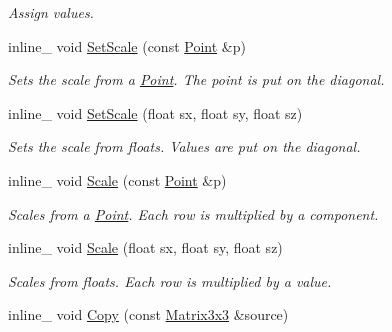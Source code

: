\begin{DoxyCompactItemize}
\begin{DoxyCompactList}\small\item\em Assign values. \end{DoxyCompactList}\item 
inline\+\_\+ void \hyperlink{classMatrix3x3_a3881bf406162edd7bff75f25eea7a38d}{Set\+Scale} (const \hyperlink{classPoint}{Point} \&p)\hypertarget{classMatrix3x3_a3881bf406162edd7bff75f25eea7a38d}{}\label{classMatrix3x3_a3881bf406162edd7bff75f25eea7a38d}

\begin{DoxyCompactList}\small\item\em Sets the scale from a \hyperlink{classPoint}{Point}. The point is put on the diagonal. \end{DoxyCompactList}\item 
inline\+\_\+ void \hyperlink{classMatrix3x3_ab41b04b95b68fef87e6acac6d1a35f55}{Set\+Scale} (float sx, float sy, float sz)\hypertarget{classMatrix3x3_ab41b04b95b68fef87e6acac6d1a35f55}{}\label{classMatrix3x3_ab41b04b95b68fef87e6acac6d1a35f55}

\begin{DoxyCompactList}\small\item\em Sets the scale from floats. Values are put on the diagonal. \end{DoxyCompactList}\item 
inline\+\_\+ void \hyperlink{classMatrix3x3_a19d9b0ee7f43f45120a9c33c625e83c3}{Scale} (const \hyperlink{classPoint}{Point} \&p)\hypertarget{classMatrix3x3_a19d9b0ee7f43f45120a9c33c625e83c3}{}\label{classMatrix3x3_a19d9b0ee7f43f45120a9c33c625e83c3}

\begin{DoxyCompactList}\small\item\em Scales from a \hyperlink{classPoint}{Point}. Each row is multiplied by a component. \end{DoxyCompactList}\item 
inline\+\_\+ void \hyperlink{classMatrix3x3_a5eab275f6204853875dd8837efdf695b}{Scale} (float sx, float sy, float sz)\hypertarget{classMatrix3x3_a5eab275f6204853875dd8837efdf695b}{}\label{classMatrix3x3_a5eab275f6204853875dd8837efdf695b}

\begin{DoxyCompactList}\small\item\em Scales from floats. Each row is multiplied by a value. \end{DoxyCompactList}\item 
inline\+\_\+ void \hyperlink{classMatrix3x3_a28ff52567bb186d38053a2740dbb23eb}{Copy} (const \hyperlink{classMatrix3x3}{Matrix3x3} \&source)\hypertarget{classMatrix3x3_a28ff52567bb186d38053a2740dbb23eb}{}\label{classMatrix3x3_a28ff52567bb186d38053a2740dbb23eb}


\end{DoxyCompactItemize}
